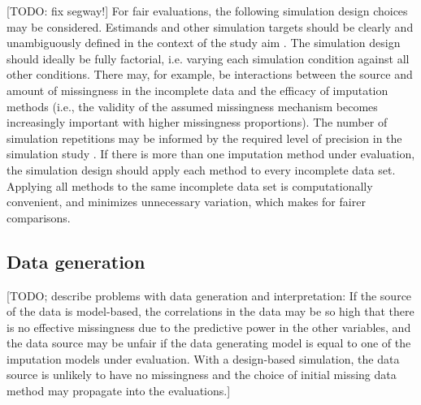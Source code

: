 \documentclass[bimj,fleqn]{w-art}
\begin{document}
[TODO: fix segway!] For fair evaluations, the following simulation design choices may be considered. Estimands and other simulation targets should be clearly and unambiguously defined in the context of the study aim \citet{pete14}. The simulation design should ideally be fully factorial, i.e. varying each simulation condition against all other conditions. There may, for example, be interactions between the source and amount of missingness in the incomplete data and the efficacy of imputation methods (i.e., the validity of the assumed missingness mechanism becomes increasingly important with higher missingness proportions). The number of simulation repetitions may be informed by the required level of precision in the simulation study \citep[e.g. as determined from a maximum tolerable level of uncertainty in terms of a performance measure's Monte Carlo error][]{morr18}. If there is more than one imputation method under evaluation, the simulation design should apply each method to every incomplete data set. Applying all methods to the same incomplete data set is computationally convenient, and minimizes unnecessary variation, which makes for fairer comparisons.


\subsection{Data generation}


[TODO; describe problems with data generation and interpretation: If the source of the data is model-based, the correlations in the data may be so high that there is no effective missingness due to the predictive power in the other variables, and the data source may be unfair if the data generating model is equal to one of the imputation models under evaluation. With a design-based simulation, the data source is unlikely to have no missingness and the choice of initial missing data method may propagate into the evaluations.]
\end{document}
